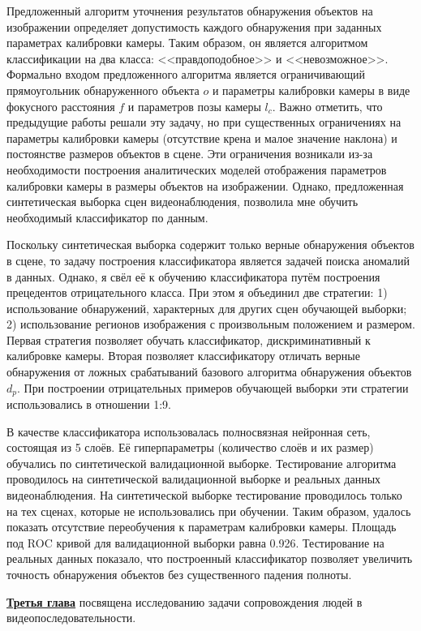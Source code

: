Предложенный алгоритм уточнения результатов обнаружения объектов на изображении определяет допустимость каждого обнаружения при заданных параметрах калибровки камеры. Таким образом, он является алгоритмом классификации на два класса: <<правдоподобное>> и <<невозможное>>. Формально входом предложенного алгоритма является ограничивающий прямоугольник обнаруженного объекта $o$ и параметры калибровки камеры в виде фокусного расстояния $f$ и параметров позы камеры $l_c$. Важно отметить, что предыдущие работы решали эту задачу, но при существенных ограничениях на параметры калибровки камеры (отсутствие крена и малое значение наклона) и постоянстве размеров объектов в сцене. Эти ограничения возникали из-за необходимости построения аналитических моделей отображения параметров калибровки камеры в размеры объектов на изображении. Однако, предложенная синтетическая выборка сцен видеонаблюдения, позволила мне обучить необходимый классификатор по данным.

Поскольку синтетическая выборка содержит только верные обнаружения объектов в сцене, то задачу построения классификатора является задачей поиска аномалий в данных. Однако, я свёл её к обучению классификатора путём построения прецедентов отрицательного класса. При этом я объединил две стратегии: 1) использование обнаружений, характерных для других сцен обучающей выборки; 2) использование регионов изображения с произвольным положением и размером. Первая стратегия позволяет обучать классификатор, дискриминативный к калибровке камеры. Вторая позволяет классификатору отличать верные обнаружения от ложных срабатываний базового алгоритма обнаружения объектов $d_p$. При построении отрицательных примеров обучающей выборки эти стратегии использовались в отношении 1:9.

В качестве классификатора использовалась полносвязная нейронная сеть, состоящая из 5 слоёв. Её гиперпараметры (количество слоёв и их размер) обучались по синтетической валидационной выборке. Тестирование алгоритма проводилось на синтетической валидационной выборке и реальных данных видеонаблюдения.  На синтетической выборке тестирование проводилось только на тех сценах, которые не использовались при обучении. Таким образом, удалось показать отсутствие переобучения к параметрам калибровки камеры. Площадь под ROC кривой для валидационной выборки равна 0.926. Тестирование на реальных данных показало, что построенный классификатор позволяет увеличить точность обнаружения объектов без существенного падения полноты.

\underline{\textbf{Третья глава}} посвящена исследованию задачи сопровождения людей в видеопоследовательности.

